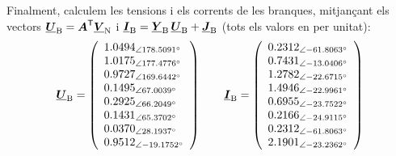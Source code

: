 \begin{exemple}
    Finalment, calculem les tensions i els corrents de les branques,
    mitjançant els vectors $\underline{\boldsymbol{U}}_\mathrm{B} = \boldsymbol{A}^\mathrm{\textsf{T}}
    \underline{\boldsymbol{V}}_\mathrm{N}$ i $\underline{\boldsymbol{I}}_\mathrm{B} =  \underline{\boldsymbol{Y}}_\mathrm{B}\,
    \underline{\boldsymbol{U}}_\mathrm{B} + \underline{\boldsymbol{J}}_\mathrm{B}$ (tots els valors en per unitat):
    \[
       \underline{\boldsymbol{U}}_\mathrm{B} =
       \left(\begin{array}{l}
         \num{1,0494}_{\angle\ang{ 178,5091}} \\
         \num{1,0175}_{\angle\ang{ 177,4776}} \\
         \num{0,9727}_{\angle\ang{ 169,6442}} \\
         \num{0,1495}_{\angle\ang{  67,0039}} \\
         \num{0,2925}_{\angle\ang{  66,2049}} \\
         \num{0,1431}_{\angle\ang{  65,3702}} \\
         \num{0,0370}_{\angle\ang{  28,1937}} \\
         \num{0,9512}_{\angle\ang{ -19,1752}}
       \end{array}\right)
       \qquad
       \underline{\boldsymbol{I}}_\mathrm{B} =
       \left(\begin{array}{l}
         \num{0,2312}_{\angle\ang{-61,8063}} \\
         \num{0,7431}_{\angle\ang{-13,0406}} \\
         \num{1,2782}_{\angle\ang{-22,6715}} \\
         \num{1,4946}_{\angle\ang{-22,9961}} \\
         \num{0,6955}_{\angle\ang{-23,7522}} \\
         \num{0,2166}_{\angle\ang{-24,9115}} \\
         \num{0,2312}_{\angle\ang{-61,8063}} \\
         \num{2,1901}_{\angle\ang{-23,2362}}
       \end{array}\right)
    \]


\end{exemple}
